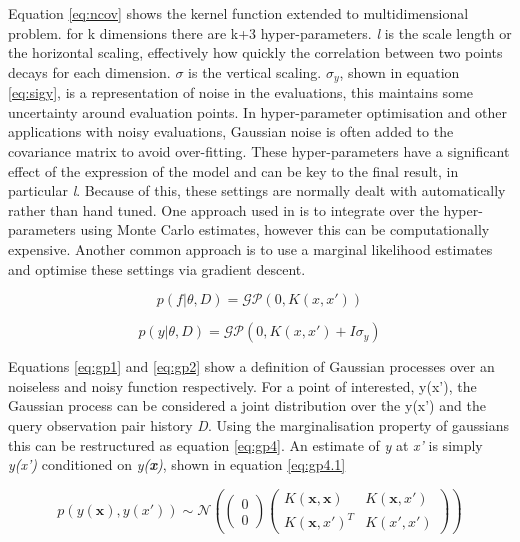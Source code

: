 \documentclass{article}
\begin{document}
			 Equation \ref{eq:ncov} shows the kernel function extended to multidimensional problem. for k dimensions there are k+3 hyper-parameters. \textit{l} is the scale length or the horizontal scaling, effectively how quickly the correlation between two points decays for each dimension. \(\sigma\) is the vertical scaling. \(\sigma_y\), shown in equation \ref{eq:sigy}, is a representation of noise in the evaluations, this maintains some uncertainty around evaluation points.  In hyper-parameter optimisation and other applications with noisy evaluations, Gaussian noise is often added to the covariance matrix to avoid over-fitting. These hyper-parameters have a significant effect of the expression of the model and can be key to the final result, in particular \textit{l}. Because of this, these settings are normally dealt with automatically rather than hand tuned. One approach used in \cite{17} is to integrate over the hyper-parameters using Monte Carlo estimates, however this can be computationally expensive. Another common approach is to use a marginal likelihood estimates and optimise these settings via gradient descent.

 


			\begin{equation}\label{eq:gp1} p(f|\theta,D) = \mathcal{GP}(0,K(x,x'))\end{equation}

			\begin{equation}\label{eq:gp2} p(y|\theta,D) = \mathcal{GP}(0,K(x,x') + I\sigma_y)\end{equation}


 			Equations \ref{eq:gp1} and \ref{eq:gp2} show a definition of Gaussian processes over an noiseless and noisy function respectively. For a point of interested, y(x'), the Gaussian process can be considered a joint distribution over the y(x') and the query observation pair history \textit{D}. Using the marginalisation property of gaussians this can be restructured as equation \ref{eq:gp4}. An estimate of \textit{y} at \textit{x'} is simply \textit{y(x')} conditioned on \textit{y(\textbf{x})}, shown in equation \ref{eq:gp4.1}

			\begin{equation}
			\label{eq:gp4} p(y(\bm{x}),y(x')) \sim \mathcal{N} \left(\begin{pmatrix}
			0\\
			0
			\end{pmatrix}
			\begin{pmatrix} K(\bm{x} , \bm{x}) & K(\bm{x},x')\\
							K(\bm{x},x')^T &  K(x',x')
			\end{pmatrix}\right)\end{equation}
\end{document}
